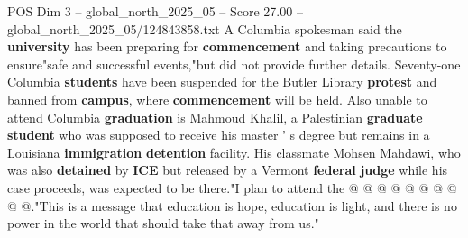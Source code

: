 \begin{textsample}{POS Dim 3 – global\_north\_2025\_05 – Score 27.00 – global\_north\_2025\_05/124843858.txt}
A Columbia spokesman said the \textbf{university} has been preparing for \textbf{commencement} and taking precautions to ensure"safe and successful events,"but did not provide further details.
Seventy-one Columbia \textbf{students} have been suspended for the Butler Library \textbf{protest} and banned from \textbf{campus}, where \textbf{commencement} will be held.
Also unable to attend Columbia \textbf{graduation} is Mahmoud Khalil, a Palestinian \textbf{graduate} \textbf{student} who was supposed to receive his master ' s degree but remains in a Louisiana \textbf{immigration} \textbf{detention} facility.
His classmate Mohsen Mahdawi, who was also \textbf{detained} by \textbf{ICE} but released by a Vermont \textbf{federal} \textbf{judge} while his case proceeds, was expected to be there."I plan to attend the @ @ @ @ @ @ @ @ @ @."This is a message that education is hope, education is light, and there is no power in the world that should take that away from us."

\end{textsample}
